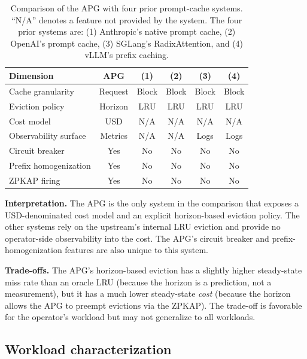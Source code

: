 \begin{table}[ht]
\centering
\caption{Comparison of the APG with four prior prompt-cache
systems. ``N/A'' denotes a feature not provided by the system.
The four prior systems are: (1) Anthropic's native prompt
cache, (2) OpenAI's prompt cache, (3) SGLang's RadixAttention,
and (4) vLLM's prefix caching.}
\label{tab:apg-comparison}
\begin{tabular}{lccccc}
\toprule
\textbf{Dimension} & \textbf{APG} & \textbf{(1)} & \textbf{(2)} & \textbf{(3)} & \textbf{(4)} \\
\midrule
Cache granularity      & Request & Block  & Block  & Block & Block  \\
Eviction policy        & Horizon & LRU    & LRU    & LRU   & LRU    \\
Cost model             & USD     & N/A    & N/A    & N/A   & N/A    \\
Observability surface  & Metrics & N/A    & N/A    & Logs  & Logs   \\
Circuit breaker        & Yes     & No     & No     & No    & No     \\
Prefix homogenization  & Yes     & No     & No     & No    & No     \\
ZPKAP firing           & Yes     & No     & No     & No    & No     \\
\bottomrule
\end{tabular}
\end{table}

\noindent
\textbf{Interpretation.} The APG is the only system in the
comparison that exposes a USD-denominated cost model and an
explicit horizon-based eviction policy. The other systems rely
on the upstream's internal LRU eviction and provide no
operator-side observability into the cost. The APG's
circuit breaker and prefix-homogenization features are also
unique to this system.

\noindent
\textbf{Trade-offs.} The APG's horizon-based eviction has a
slightly higher steady-state miss rate than an oracle LRU
(because the horizon is a prediction, not a measurement), but
it has a much lower steady-state \emph{cost} (because the
horizon allows the APG to preempt evictions via the ZPKAP).
The trade-off is favorable for the operator's workload but
may not generalize to all workloads.

\subsection{Workload characterization}
\label{app:apg:workload}

